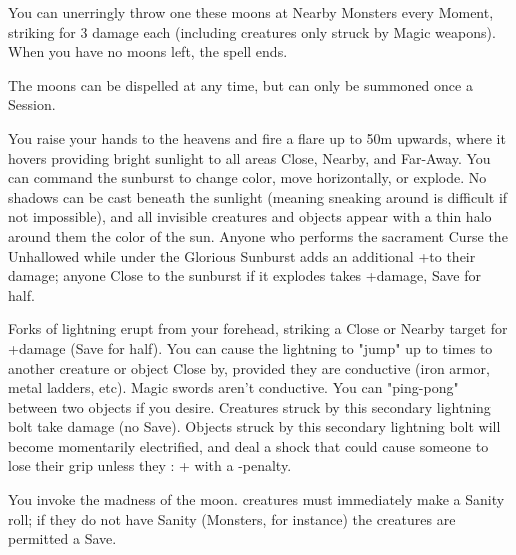 {You can unerringly throw one these moons at Nearby Monsters every Moment, striking for 3 damage each (including creatures only struck by Magic weapons).  When you have no moons left, the spell ends.

The moons can be dispelled at any time, but can only be summoned once a Session.

\MYSTERY [
  Name = Glorious Sunburst,
  Link = arcana-mystery-glorious-sunburst,
  Paradigm = Elements,
  Save = Y (half),
  Duration = Combat or \SUM Minutes,
  Target = See Below
]

You raise your hands to the heavens and fire a flare up to 50m upwards, where it hovers providing bright sunlight to all areas Close, Nearby, and Far-Away.  You can command the sunburst to change color, move horizontally, or explode.  No shadows can be cast beneath the sunlight (meaning sneaking around is difficult if not impossible), and all invisible creatures and objects appear with a thin halo around them the color of the sun.  Anyone who performs the sacrament Curse the Unhallowed while under the Glorious Sunburst adds an additional +\DICE to their damage; anyone Close to the sunburst if it explodes takes \SUMDICE+\DICE damage, Save for half.

\MYSTERY [
  Name = Lightning,
  Link = arcana-mystery-lightning,
  Paradigm = Elements,
  Save = Y (half),
  Duration = Instant,
  Target = Close or Nearby Target(s)
]

Forks of lightning erupt from your forehead, striking a Close or Nearby target for \SUMDICE+\DICE damage (Save for half). You can cause the lightning to "jump" up to  times to another creature or object Close by, provided they are conductive (iron armor, metal ladders, etc).  Magic swords aren't conductive.  You can "ping-pong" between two objects if you desire. Creatures struck by this secondary lightning bolt take \DICE damage (no Save). Objects struck by this secondary lightning bolt will become momentarily electrified, and deal a shock that could cause someone to lose their grip unless they \RO : \VIG + \FOC with a -\DICE penalty.

\MYSTERY [
  Name = Lunacy,
  Link = arcana-mystery-lunacy,
  Paradigm = Mind,
  Save = Y (neg.),
  Duration = Markovian,
  Target = Close or Nearby Target(s)
]

You invoke the madness of the moon.  \DICE creatures must immediately make a Sanity roll; if they do not have Sanity (Monsters, for instance) the creatures are permitted a Save.

}
